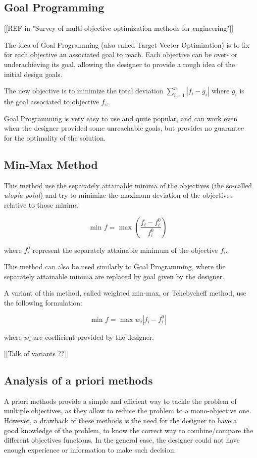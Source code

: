 \subsection{Goal Programming}

[[REF in "Survey of multi-objective optimization methods for engineering"]]

The idea of Goal Programming (also called Target Vector Optimization) is to fix for each objective an associated goal to reach. Each objective can be over- or underachieving its goal, allowing the designer to provide a rough idea of the initial design goals.

The new objective is to minimize the total deviation $\sum_{i=1}^n |f_i - g_i|$ where $g_i$ is the goal associated to objective $f_i$.

Goal Programming is very easy to use and quite popular, and can work even when the designer provided some unreachable goals, but provides no guarantee for the optimality of the solution.

\subsection{Min-Max Method}

This method use the separately attainable minima of the objectives (the so-called \emph{utopia point}) and try to minimize the maximum deviation of the objectives relative to those minima:

\[ \text{min } f = \text{ max } \left( \frac{f_i - f_i^0}{f_i^0} \right) \]

where $f_i^0$ represent the separately attainable minimum of the objective $f_i$.

This method can also be used similarly to Goal Programming, where the separately attainable minima are replaced by goal given by the designer.

A variant of this method, called weighted min-max, or Tchebycheff method, use the following formulation:

\[ \text{min } f = \text{ max } w_i |f_i - f_i^0| \]

where $w_i$ are coefficient provided by the designer.

[[Talk of variants ??]]

\subsection{Analysis of a priori methods}

A priori methods provide a simple and efficient way to tackle the problem of multiple objectives, as they allow to reduce the problem to a mono-objective one.
However, a drawback of these methods is the need for the designer to have a good knowledge of the problem, to know the correct way to combine/compare the different objectives functions. In the general case, the designer could not have enough experience or information to make such decision.

